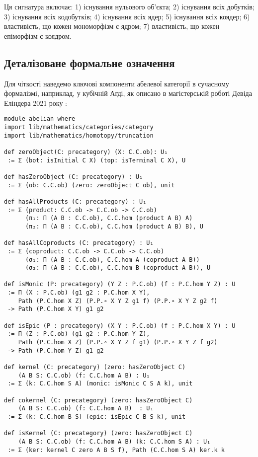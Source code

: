 \documentclass[12pt]{article}
\begin{document}
Ця сигнатура включає: 1) існування нульового об’єкта; 2) існування всіх добутків; 3) існування всіх кодобутків; 4) існування всіх ядер; 5) існування всіх коядер; 6) властивість, що кожен мономорфізм є ядром; 7) властивість, що кожен епіморфізм є коядром.

\subsection{Деталізоване формальне означення}
Для чіткості наведемо ключові компоненти абелевої категорії в сучасному формалізмі, наприклад, у кубічній Агді, як описано в магістерській роботі Девіда Еліндера 2021 року \cite{Elinder21}:

\begin{lstlisting}
module abelian where
import lib/mathematics/categories/category
import lib/mathematics/homotopy/truncation

def zeroObject(C: precategory) (X: C.C.ob): U₁
 := Σ (bot: isInitial C X) (top: isTerminal C X), U

def hasZeroObject (C: precategory) : U₁
 := Σ (ob: C.C.ob) (zero: zeroObject C ob), unit

def hasAllProducts (C: precategory) : U₁
 := Σ (product: C.C.ob -> C.C.ob -> C.C.ob)
      (π₁: Π (A B : C.C.ob), C.C.hom (product A B) A)
      (π₂: Π (A B : C.C.ob), C.C.hom (product A B) B), U

def hasAllCoproducts (C: precategory) : U₁
 := Σ (coproduct: C.C.ob -> C.C.ob -> C.C.ob)
      (σ₁: Π (A B : C.C.ob), C.C.hom A (coproduct A B))
      (σ₂: Π (A B : C.C.ob), C.C.hom B (coproduct A B)), U

def isMonic (P: precategory) (Y Z : P.C.ob) (f : P.C.hom Y Z) : U
 := Π (X : P.C.ob) (g1 g2 : P.C.hom X Y),
    Path (P.C.hom X Z) (P.P.∘ X Y Z g1 f) (P.P.∘ X Y Z g2 f)
 -> Path (P.C.hom X Y) g1 g2

def isEpic (P : precategory) (X Y : P.C.ob) (f : P.C.hom X Y) : U
 := Π (Z : P.C.ob) (g1 g2 : P.C.hom Y Z),
    Path (P.C.hom X Z) (P.P.∘ X Y Z f g1) (P.P.∘ X Y Z f g2)
 -> Path (P.C.hom Y Z) g1 g2

def kernel (C: precategory) (zero: hasZeroObject C)
    (A B S: C.C.ob) (f: C.C.hom A B) : U₁
 := Σ (k: C.C.hom S A) (monic: isMonic C S A k), unit

def cokernel (C: precategory) (zero: hasZeroObject C)
    (A B S: C.C.ob) (f: C.C.hom A B)  : U₁
 := Σ (k: C.C.hom B S) (epic: isEpic C B S k), unit

def isKernel (C: precategory) (zero: hasZeroObject C)
    (A B S: C.C.ob) (f: C.C.hom A B) (k: C.C.hom S A) : U₁
 := Σ (ker: kernel C zero A B S f), Path (C.C.hom S A) ker.k k


\end{lstlisting}
\end{document}
